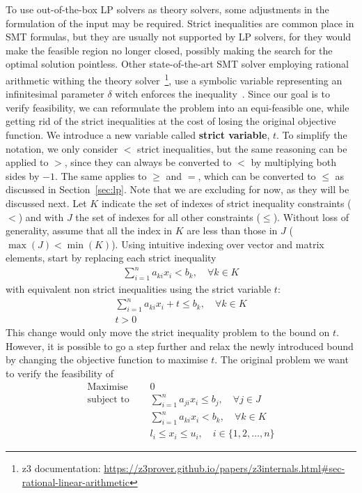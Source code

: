 \documentclass[runningheads]{llncs}
\begin{document}
To use out-of-the-box LP solvers as theory solvers, some adjustments in the formulation of the input may be required.
Strict inequalities are common place in SMT formulas, but they are usually not supported by LP solvers, for they would make the feasible region no longer closed, possibly making the search for the optimal solution pointless.
Other state-of-the-art SMT solver employing rational arithmetic withing the theory solver~\footnote{z3 documentation: \url{https://z3prover.github.io/papers/z3internals.html\#sec-rational-linear-arithmetic}}, use a symbolic variable representing an infinitesimal parameter $\delta$ witch enforces the inequality~\cite{ref:lra-dpll-t}.
Since our goal is to verify feasibility, we can reformulate the problem into an equi-feasible one, while getting rid of the strict inequalities at the cost of losing the original objective function.
We introduce a new variable called \textbf{strict variable}, $t$.
To simplify the notation, we only consider $<$ strict inequalities, but the same reasoning can be applied to $>$, since they can always be converted to $<$ by multiplying both sides by $-1$.
The same applies to $\ge$ and $=$, which can be converted to $\le$ as discussed in Section~\ref{sec:lp}.
Note that we are excluding \nqcs for now, as they will be discussed next.
Let $K$ indicate the set of indexes of strict inequality constraints ($<$) and with $J$ the set of indexes for all other constraints ($\le$).
Without loss of generality, assume that all the index in $K$ are less than those in $J$ ($\max(J) < \min(K)$).
Using intuitive indexing over vector and matrix elements, start by replacing each strict inequality
\begin{align*}
    \sum_{i=1}^{n} a_{ki}x_{i} < b_k, \quad \forall k \in K
\end{align*}
with equivalent non strict inequalities using the strict variable $t$:
\begin{align*}
    \sum_{i=1}^{n} a_{ki}x_{i} + t \le b_k, \quad \forall k \in K \\
    t > 0
\end{align*}
This change would only move the strict inequality problem to the bound on $t$.
However, it is possible to go a step further and relax the newly introduced bound by changing the objective function to maximise $t$.
The original problem we want to verify the feasibility of
\begin{equation}
    \label{eq:lp-original}
    \begin{split}
        \text{Maximise }   \quad & 0                                                          \\
        \text{subject to } \quad & \sum_{i=1}^{n} a_{ji}x_{i} \le b_j,  \quad \forall j \in J \\
        \quad                    & \sum_{i=1}^{n} a_{ki}x_{i} < b_k,   \quad \forall k \in K  \\
                                 & l_i \le x_i \le u_i,  \quad i \in \{1, 2, \ldots, n\}
    \end{split}
\end{equation}
\end{document}
